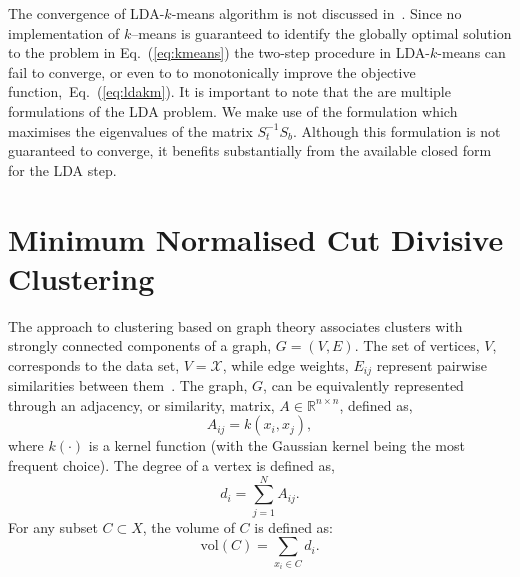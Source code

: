 \documentclass{book}
\def\R{\mathbb{R}}
\begin{document}
The convergence of LDA-$k$-means algorithm is not discussed
in~\cite{DingL2007}.
%
Since no implementation of $k$--means is guaranteed to identify the
globally optimal solution to the problem in Eq.~(\ref{eq:kmeans}) the two-step
procedure in LDA-$k$-means can fail to converge, or even to to
monotonically improve the objective function,~Eq.~(\ref{eq:ldakm}). 
%
It is important to note that the are multiple formulations of the LDA problem.
We make use of the formulation which maximises the eigenvalues of the matrix
$S_t^{-1}S_b$. Although this formulation is not guaranteed to converge, it
benefits substantially from the available closed form for the LDA step. 

%
%




%

%

\section{Minimum Normalised Cut Divisive Clustering}

The approach to clustering based on graph theory associates clusters with strongly
connected components of a graph, $G = (V,E)$\/. The set of vertices, $V$, corresponds
to the data set, $V=\mathcal{X}$, while edge weights, $E_{ij}$ represent pairwise
similarities between them~\cite{Luxburg2007}.
%
The graph, $G$, can be equivalently represented through an adjacency, or similarity, matrix, $A \in
\R^{n \times n}$, defined as,
%
\begin{equation}\label{eq:A}
%
A_{ij} = k(x_i, x_j),
%
\end{equation}
%
where $k(\cdot)$ is a kernel function (with the Gaussian kernel being the most frequent choice).
%
The degree of a vertex is defined as,
%
\[ d_i = \sum_{j=1}^N A_{ij}.\]
%
%
For any subset $C \subset X$, 
%
%
the volume of $C$ is defined as:
%
\[ \textrm{vol}(C) = \sum_{x_i \in C} d_i.\]
%
\end{document}
